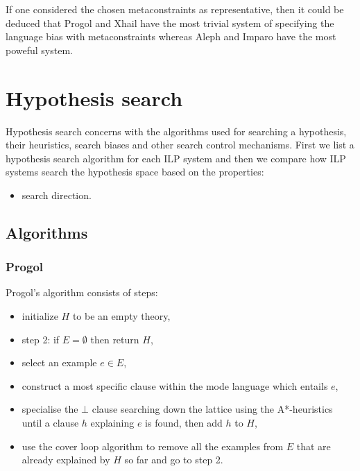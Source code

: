 If one considered the chosen metaconstraints as representative, then it could be deduced that Progol and Xhail have the most trivial system of specifying the language bias with metaconstraints whereas Aleph and Imparo have the most poweful system.

\section{Hypothesis search}
Hypothesis search concerns with the algorithms used for searching a hypothesis, their heuristics, search biases and other search control mechanisms.
First we list a hypothesis search algorithm for each ILP system and then 
we compare how ILP systems search the hypothesis space based on the properties:
\begin{itemize}
\item search direction.
\end{itemize}

\subsection{Algorithms}

\subsubsection{Progol\cite{muggleton1995inverse}\cite{kimber2012learning}}
Progol's algorithm consists of steps:
\begin{itemize}
\item initialize $H$ to be an empty theory,
\item step 2: if $E=\emptyset$ then return $H$,
\item select an example $e \in E$,
\item construct a most specific clause within the mode language which entails $e$,
\item specialise the $\bot$ clause searching down the lattice using the A*-heuristics until a clause $h$ explaining $e$ is found, then add $h$ to $H$,
\item use the cover loop algorithm to remove all the examples from $E$ that are already explained by $H$ so far and go to step 2.
\end{itemize}

